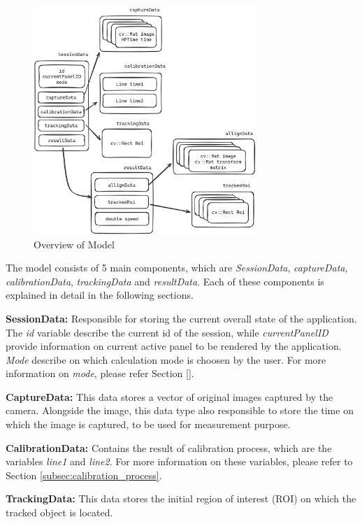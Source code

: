 \begin{figure}[!ht]
    \centering
    \includegraphics[width=0.75\textwidth]{texs/Part2/chapter4/image/sessiondata.png}
    \caption{Overview of Model}
    \label{fig:model_overview}
\end{figure}

The model consists of 5 main components, which are \textit{SessionData}, \textit{captureData}, \textit{calibrationData}, \textit{trackingData} and \textit{resultData}. Each of these components is explained in detail in the following sections.

\textbf{SessionData:} Responsible for storing the current overall state of the application. The \textit{id} variable describe the current id of the session, while \textit{currentPanelID} provide information on current active panel to be rendered by the application. \textit{Mode} describe on which calculation mode is choosen by the user. For more information on \textit{mode}, please refer Section \ref{}.

\textbf{CaptureData:} This data stores a vector of original images captured by the camera. Alongside the image, this data type also responsible to store the time on which the image is captured, to be used for measurement purpose.

\textbf{CalibrationData:} Contains the result of calibration process, which are the variables \textit{line1} and \textit{line2}. For more information on these variables, please refer to Section \ref{subsec:calibration_process}.

\textbf{TrackingData:} This data stores the initial region of interest (ROI) on which the tracked object is located.

